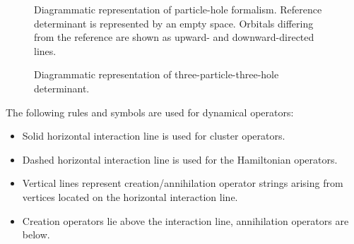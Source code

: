 \documentclass[twoside,english]{uiofysmaster}
\begin{document}
\begin{figure}[h!]
	\bdiagd
	\ediag
	\bdiagd
	\ediag
	\bdiagd
	\ediag
	\bdiagd
	\ediag
	\caption{Diagrammatic representation of particle-hole formalism. Reference determinant is represented by an empty space. Orbitals differing from the reference are shown as upward- and downward-directed lines.} \label{fig:referencediag}
\end{figure}


\begin{figure}[h!]
	\centering
	\bdiagd
	\ediag
	\caption{Diagrammatic representation of three-particle-three-hole determinant.} \label{fig:3detdiag}
\end{figure}

The following rules and symbols are used for dynamical operators:

\begin{itemize}
	\item Solid horizontal interaction line is used for cluster operators.
	\item Dashed horizontal interaction line is used for the Hamiltonian operators.
	\item Vertical lines represent creation/annihilation operator strings arising from vertices located on the horizontal interaction line.
	\item Creation operators lie above the interaction line, annihilation operators are below.
\end{itemize}
\end{document}
